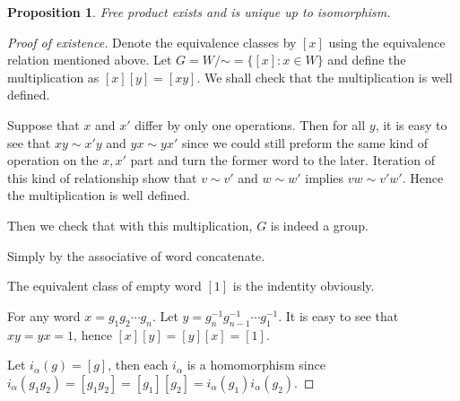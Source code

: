 \documentclass[a4paper,titlepage]{article}
\theoremstyle{remark}
\theoremstyle{definition}
\theoremstyle{definition}
\theoremstyle{plain}
\newtheorem{proposition}{Proposition}
\begin{document}
  \begin{proposition}
    Free product exists and is unique up to isomorphism.
  \end{proposition}

  \begin{proof}[Proof of existence]
    Denote the equivalence classes by $[x]$ using the equivalence relation mentioned above.
    Let $G = W\!/\mathord\sim = \{ [x] : x \in W \}$ and define the multiplication as 
    $[x][y] = [xy]$. We shall check that the multiplication is well defined.

    Suppose that $x$ and $x'$ differ by only one operations. Then for all $y$, it is easy to 
    see that $xy \sim x'y$ and $yx \sim yx'$ since we could still preform the same kind of 
    operation on the $x, x'$ part and turn the former word to the later. Iteration of this
    kind of relationship show that $v \sim v'$ and $w \sim w'$ implies $vw \sim v'w'$. Hence 
    the multiplication is well defined.

    Then we check that with this multiplication, $G$ is indeed a group.
    \begin{description}[style=standard]
      \item[associative:] Simply by the associative of word concatenate.
      \item[indentity:] The equivalent class of empty word $[1]$ is the indentity obviously.
      \item[inverse:] For any word $x = g_1 g_2 \cdots g_n$. Let $y = g^{-1}_n g^{-1}_{n-1} \cdots g^{-1}_1$.
        It is easy to see that $xy = yx = 1$, hence $[x][y] = [y][x] = [1]$.
    \end{description}
    Let $i_\alpha(g) = [g]$, then each $i_\alpha$ is a homomorphism since $i_\alpha(g_1 g_2) = [g_1 g_2]
    = [g_1] [g_2] = i_\alpha(g_1) i_\alpha(g_2)$.


\end{proof}
\end{document}
